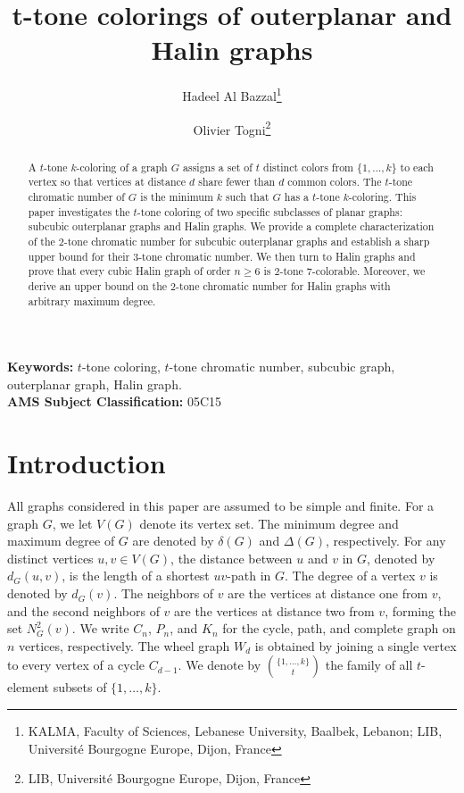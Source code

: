 \documentclass[12pt]{article}
\author{
Hadeel Al Bazzal\thanks{KALMA, Faculty of Sciences, Lebanese University, Baalbek, Lebanon; LIB, Universit\'e Bourgogne Europe, Dijon, France}
\and
Olivier Togni\thanks{LIB, Universit\'e Bourgogne Europe, Dijon, France}
}
\numberwithin{theorem}{section}
\numberwithin{conjecture}{section}
\numberwithin{corollary}{section}
\numberwithin{example}{section}
\numberwithin{lemma}{section}
\numberwithin{proposition}{section}
\numberwithin{problem}{section}
\numberwithin{remark}{section}
\numberwithin{claim}{theorem}
\numberwithin{definition}{section}
\begin{document}
\title{t-tone colorings of outerplanar and Halin graphs}
\maketitle

\begin{abstract}
A $t$-tone $k$-coloring of a graph $G$ assigns a set of $t$ distinct colors from $\{1, \dots, k\}$ to each vertex so that vertices at distance $d$ share fewer than $d$ common colors. The $t$-tone chromatic number of $G$ is the minimum $k$ such that $G$ has a $t$-tone $k$-coloring. This paper investigates the $t$-tone coloring of two specific subclasses of planar graphs: subcubic outerplanar graphs and Halin graphs. We provide a complete characterization of the $2$-tone chromatic number for subcubic outerplanar graphs and establish a sharp upper bound for their $3$-tone chromatic number. We then turn to Halin graphs and prove that every cubic Halin graph of order $n \ge 6$ is $2$-tone $7$-colorable. Moreover, we derive an upper bound on the $2$-tone chromatic number for Halin graphs with arbitrary maximum degree.
\end{abstract}

\textbf{Keywords:} $t$-tone coloring, $t$-tone chromatic number, subcubic graph, outerplanar graph, Halin graph.\\

\noindent \textbf{AMS Subject Classification:} 05C15

\section{Introduction}
All graphs considered in this paper are assumed to be simple and finite. For a graph $G$, we let $V(G)$ denote its vertex set. The minimum degree and maximum degree of $G$ are denoted by $\delta(G)$ and $\Delta(G)$, respectively. For any distinct vertices $u, v \in V(G)$, the distance between $u$ and $v$ in $G$, denoted by $d_G(u,v)$, is the length of a shortest $uv$-path in $G$. The degree of a vertex $v$ is denoted by $d_G(v)$. The neighbors of $v$ are the vertices at distance one from $v$, and the second neighbors of $v$ are the vertices at distance two from $v$, forming the set $N_G^2(v)$. We write $C_n$, $P_n$, and $K_n$ for the cycle, path, and complete graph on $n$ vertices, respectively. The wheel graph $W_d$ is obtained by joining a single vertex to every vertex of a cycle $C_{d-1}$. We denote by $\binom{\{1,\dots,k\}}{t}$ the family of all $t$-element subsets of $\{1,\dots,k\}$.
\end{document}
